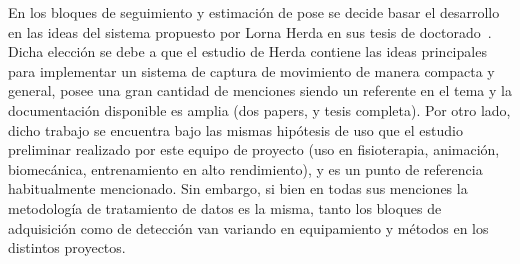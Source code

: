En los bloques de seguimiento y estimación de pose se decide basar el desarrollo en las ideas del sistema propuesto por Lorna Herda en sus tesis de doctorado~\cite{herda}. Dicha elección se debe a que el estudio de Herda contiene las ideas principales para implementar un sistema de captura de movimiento de manera compacta y general, posee una gran cantidad de menciones siendo un referente en el tema y la documentación disponible es amplia (dos papers, y tesis completa). Por otro lado, dicho trabajo se encuentra bajo las mismas hipótesis de uso que el estudio preliminar realizado por este equipo de proyecto (uso en fisioterapia, animación, biomecánica, entrenamiento en alto rendimiento), y es un punto de referencia habitualmente mencionado. Sin embargo, si bien en todas sus menciones la metodología de tratamiento de datos es la misma, tanto los bloques de adquisición como de detección van variando en equipamiento y métodos en los distintos proyectos.